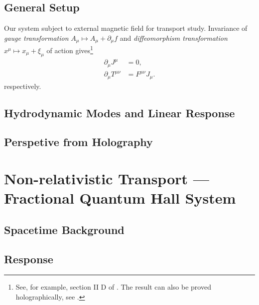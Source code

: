 \documentclass[10pt,nofootinbib]{revtex4}
\begin{document}
	\subsection{General Setup}
		Our system subject to external magnetic field for transport study. Invariance of \emph{gauge transformation} $A_\mu\mapsto A_\mu+\partial_\mu f$ and \emph{diffeomorphism transformation} $x^\mu\mapsto x_\mu+\xi_\mu$ of action gives\footnote{See, for example, section II D of \cite{herzog2009lectures}. The result can also be proved holographically, see \cite{lindgren2015holographic}.}
		\begin{align}\label{5.1.1}
			\partial_\mu J^\mu&=0,\\
			\partial_\mu T^{\mu\nu}&=F^{\mu\nu}J_\mu.
		\end{align}
		respectively.
		
	\subsection{Hydrodynamic Modes and Linear Response}
	\subsection{Perspetive from Holography}

\section{Non-relativistic Transport --- Fractional Quantum Hall System}
	\subsection{Spacetime Background}
	\subsection{Response}



\end{document}
